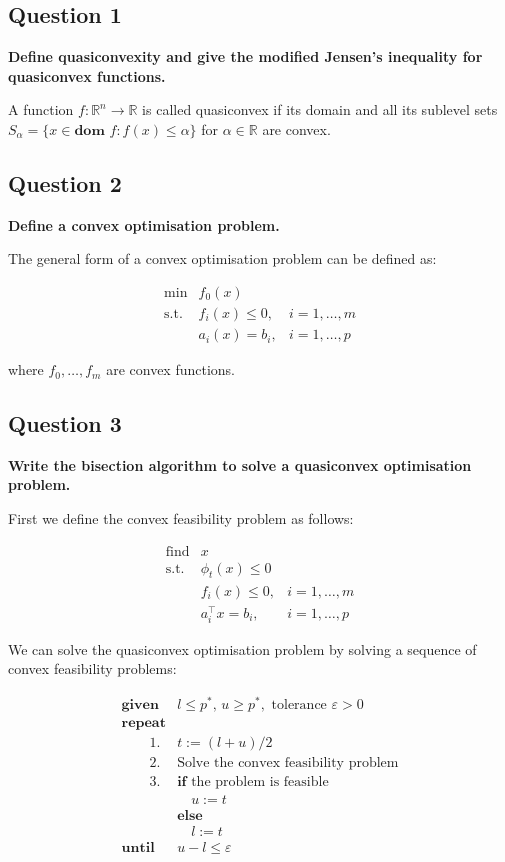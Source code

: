 
\subsection*{Question 1}
\textbf{Deﬁne quasiconvexity and give the modiﬁed Jensen's inequality for quasiconvex functions.}

A function $f: \mathbb{R}^n \to \mathbb{R}$ is called quasiconvex if its domain and all its sublevel sets $S_{\alpha} = \{x\in\textbf{dom }f : f(x) \le \alpha \}$ for $\alpha \in \mathbb{R}$ are convex.

\subsection*{Question 2}
\textbf{Deﬁne a convex optimisation problem.}

The general form of a convex optimisation problem can be defined as:

$$
\begin{array}{lll}
    \text{min} & f_0(x) & \\
    \text{s.t.} & f_i(x) \leq 0, & i = 1, \ldots, m \\
    & a_i(x) = b_i, & i = 1, \ldots, p
\end{array}
$$

where $f_0,\dots,f_m$ are convex functions. 

\subsection*{Question 3}
\textbf{Write the bisection algorithm to solve a quasiconvex optimisation problem.}

First we define the convex feasibility problem as follows: 

$$
\begin{array}{lll}
\text{find} & x &\\
\text{s.t.} & \phi_t(x) \le 0 & \\
& f_i(x) \le 0, & i = 1,\dots,m\\
& a_i^\top x = b_i,  & i = 1,\dots,p
\end{array}
$$

We can solve the quasiconvex optimisation problem by solving a sequence of convex feasibility problems:

$$
\begin{array}{ll}
\textbf{given} & l\le p^*,\, u\ge p^*, \text{ tolerance } \varepsilon>0 \\
\textbf{repeat} & \\
\quad \quad 1. & t:=(l+u)/2 \\
\quad \quad 2. & \text{Solve the convex feasibility problem} \\
\quad \quad 3. & \textbf{if} \text{ the problem is feasible} \\ 
& \quad u:=t \\
& \textbf{else} \\ 
& \quad l:=t \\
\textbf{until} & u-l \le \varepsilon
\end{array}
$$


